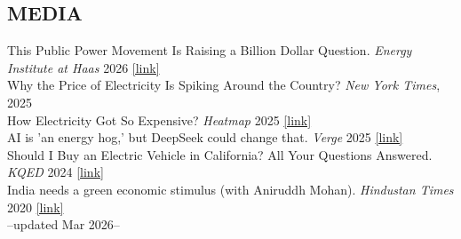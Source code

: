 \documentclass[centered, 11pt]{res}
\begin{document}
\begin{resume}
\section{MEDIA}
This Public Power Movement Is Raising a Billion Dollar Question. \textit{Energy Institute at Haas} 2026 \href{https://energyathaas.wordpress.com/2026/03/09/this-public-power-movement-is-raising-a-billion-dollar-question/}{[link]}\\
Why the Price of Electricity Is Spiking Around the Country? \textit{New York Times}, 2025 \\
How Electricity Got So Expensive? \textit{Heatmap} 2025 \href{https://heatmap.news/energy/why-is-electricity-so-expensive}{[link]}\\
AI is 'an energy hog,' but DeepSeek could change that. \textit{Verge} 2025 \href{https://www.theverge.com/climate-change/603622/deepseek-ai-environment-energy-climate}{[link]}\\
Should I Buy an Electric Vehicle in California? All Your Questions Answered. \textit{KQED} 2024 \href{https://www.kqed.org/science/1991185/should-i-buy-an-electric-vehicle-in-california-all-your-questions-answered}{[link]}\\
India needs a green economic stimulus (with Aniruddh Mohan). \textit{Hindustan Times} 2020 \href{https://www.hindustantimes.com/analysis/covid-19-india-needs-a-green-economic-stimulus-opinion/story-MnFm3MdzRWWv1pD5COFKzJ.html}{[link]}\\
--updated Mar 2026--
\end{resume}
\end{document}
